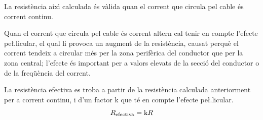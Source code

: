 La resist\`{e}ncia aix\'{\i} calculada \'{e}s v\`{a}lida quan el corrent que circula
pel cable \'{e}s corrent continu.

Quan el corrent que circula pel cable \'{e}s
corrent altern cal tenir en compte l'efecte pe{\l.l}icular, el qual
li provoca un augment de la resist\`{e}ncia, causat perqu\`{e} el corrent
tendeix a circular m\'{e}s per la zona perif\`{e}rica del conductor que per
la zona central; l'efecte \'{e}s important per a valors elevats de la
secci\'{o} del conductor o de la freq\"{u}\`{e}ncia del corrent.

La resist\`{e}ncia efectiva es troba a
partir de la resist\`{e}ncia calculada anteriorment per a corrent
continu, i d'un factor k que t\'{e} en compte l'efecte pe{\l.l}icular.
\begin{equation}
   R_\mathrm{efectiva} = \text{k} R
\end{equation}

